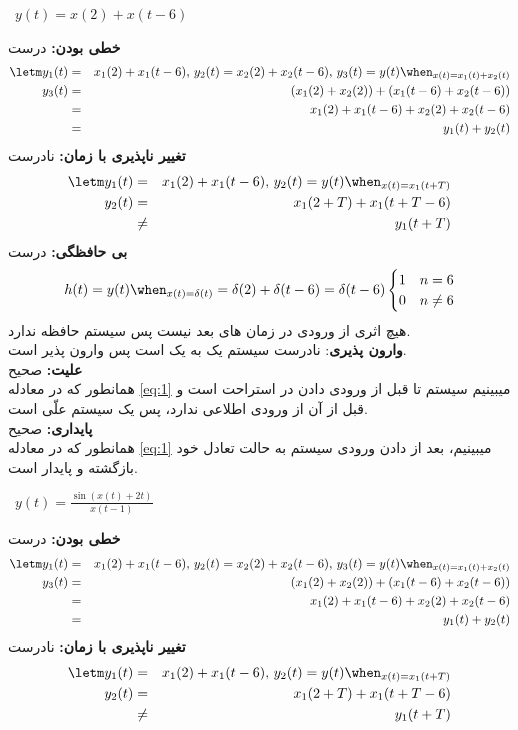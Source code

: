 \begin{qsolve}[]
	\textbullet\ $y(t)=x(2)+x(t-6)$
	\begin{qsolve}[]
		\textbf{خطی بودن:} درست
		\begin{eqnarray*}
			\letm y_1(t)&=&x_1(2)+x_1(t-6),\, y_2(t)=x_2(2)+x_2(t-6),\,
			y_3(t)=y(t)\when_{x(t)=x_1(t)+x_2(t)}\\
			y_3(t)&=&(x_1(2)+x_2(2))+(x_1(t-6)+x_2(t-6))\\
			&=& x_1(2)+x_1(t-6) + x_2(2)+x_2(t-6)\\
			&=& y_1(t)+y_2(t)
		\end{eqnarray*}
		\textbf{تغییر ناپذیری با زمان:} نادرست
		\begin{eqnarray*}
			\letm y_1(t)&=&x_1(2)+x_1(t-6),\, y_2(t)=y(t)\when_{x(t)=x_1(t+T)}\\
			y_2(t)&=&x_1(2+T)+x_1(t+T-6) \\
			&\neq& y_1(t+T)
		\end{eqnarray*}
		\textbf{بی حافظگی:} درست
		\begin{eqnarray}\label{eq:1}
			h(t)=y(t)\when_{x(t)=\delta(t)}=\delta(2)+\delta(t-6)=\delta(t-6)
			\begin{cases}
				1 & n = 6    \\
				0 & n \neq 6
			\end{cases}
		\end{eqnarray}
		هیچ اثری از ورودی در زمان های بعد نیست پس سیستم حافظه ندارد.\\
		\textbf{وارون پذیری}: نادرست
		سیستم یک به یک است پس وارون پذیر است.\\
		\textbf{علیت:} صحیح\\
		همانطور که در معادله \ref*{eq:1} میبینیم سیستم تا
		قبل از ورودی دادن در استراحت است و قبل از آن از ورودی
		اطلاعی ندارد، پس یک سیستم علّی است.\\
		\textbf{پایداری:} صحیح\\
		همانطور که در معادله \ref*{eq:1} میبینیم، بعد از
		دادن ورودی سیستم به حالت تعادل خود بازگشته و پایدار است.
	\end{qsolve}
	\textbullet\ $y(t)=\frac{\sin(x(t)+2t)}{x(t-1)}$
	\begin{qsolve}[]
		\textbf{خطی بودن:} درست
		\begin{eqnarray*}
			\letm y_1(t)&=&x_1(2)+x_1(t-6),\, y_2(t)=x_2(2)+x_2(t-6),\,
			y_3(t)=y(t)\when_{x(t)=x_1(t)+x_2(t)}\\
			y_3(t)&=&(x_1(2)+x_2(2))+(x_1(t-6)+x_2(t-6))\\
			&=& x_1(2)+x_1(t-6) + x_2(2)+x_2(t-6)\\
			&=& y_1(t)+y_2(t)
		\end{eqnarray*}
		\textbf{تغییر ناپذیری با زمان:} نادرست
		\begin{eqnarray*}
			\letm y_1(t)&=&x_1(2)+x_1(t-6),\, y_2(t)=y(t)\when_{x(t)=x_1(t+T)}\\
			y_2(t)&=&x_1(2+T)+x_1(t+T-6) \\
			&\neq& y_1(t+T)
		\end{eqnarray*}
	\end{qsolve}
\end{qsolve}
